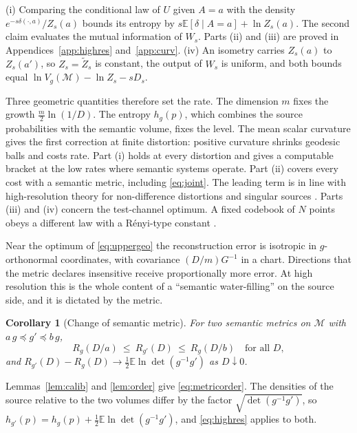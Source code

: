 \documentclass[10pt,journal]{IEEEtran}
\newtheorem{corollary}{Corollary}
\newcommand{\E}{\mathbb E}
\newcommand{\M}{\mathcal M}
\begin{document}
\begin{IEEEproof}
(i) Comparing the conditional law of $U$ given $A=a$ with the density $e^{-s\delta(\cdot,a)}/Z_s(a)$ bounds its entropy by $s\E[\delta\mid A=a]+\ln Z_s(a)$. The second claim evaluates the mutual information of $W_s$. Parts (ii) and (iii) are proved in Appendices~\ref{app:highres} and~\ref{app:curv}. (iv) An isometry carries $Z_s(a)$ to $Z_s(a')$, so $Z_s=\tilde Z_s$ is constant, the output of $W_s$ is uniform, and both bounds equal $\ln V_g(\M)-\ln Z_s-sD_s$.
\end{IEEEproof}
Three geometric quantities therefore set the rate. The dimension $m$ fixes the growth $\frac m2\ln(1/D)$. The entropy $h_g(p)$, which combines the source probabilities with the semantic volume, fixes the level. The mean scalar curvature gives the first correction at finite distortion: positive curvature shrinks geodesic balls and costs rate. Part (i) holds at every distortion and gives a computable bracket at the low rates where semantic systems operate. Part (ii) covers every cost with a semantic metric, including \eqref{eq:joint}. The leading term is in line with high-resolution theory for non-difference distortions and singular sources \cite{linder1999high,koliander2016entropy,riegler2023lossy}. Parts (iii) and (iv) concern the test-channel optimum. A fixed codebook of $N$ points obeys a different law with a R\'enyi-type constant \cite{iacobelli2016quantization}.

Near the optimum of \eqref{eq:uppergeo} the reconstruction error is isotropic in $g$-orthonormal coordinates, with covariance $(D/m)G^{-1}$ in a chart. Directions that the metric declares insensitive receive proportionally more error. At high resolution this is the whole content of a ``semantic water-filling'' on the source side, and it is dictated by the metric.
\begin{corollary}[Change of semantic metric]\label{cor:metric}
For two semantic metrics on $\M$ with $a\,g\preceq g'\preceq b\,g$,
\begin{equation}
 R_g(D/a)\ \le\ R_{g'}(D)\ \le\ R_g(D/b)\quad\text{for all }D, \label{eq:metricorder}
\end{equation}
and $R_{g'}(D)-R_g(D)\to\frac12\E\ln\det(g^{-1}g')$ as $D\downarrow0$.
\end{corollary}
\begin{IEEEproof}
Lemmas~\ref{lem:calib} and \ref{lem:order} give \eqref{eq:metricorder}. The densities of the source relative to the two volumes differ by the factor $\sqrt{\det(g^{-1}g')}$, so $h_{g'}(p)=h_g(p)+\frac12\E\ln\det(g^{-1}g')$, and \eqref{eq:highres} applies to both.
\end{IEEEproof}
\end{document}
